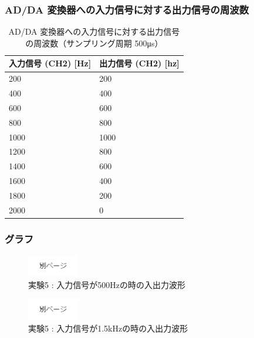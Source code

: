 \documentclass[10pt]{article}
\begin{document}
\subsubsection{AD/DA 変換器への入力信号に対する出力信号の周波数}

\begingroup
\setlength{\tabcolsep}{5pt} %
\renewcommand{\arraystretch}{1.5} %
\begin{table}[H]
    \centering
	\caption{AD/DA 変換器への入力信号に対する出力信号の周波数（サンプリング周期 500μs） }
	\begin{tabular}{|l|l|}
	    \hline
	      入力信号 (CH2) [Hz] & 出力信号 (CH2) [hz]\\[0.5ex]
		\hline\hline
            200  & 200  \\ \hline
            400  & 400  \\ \hline
            600  & 600  \\ \hline
            800  & 800  \\ \hline
            1000 & 1000 \\ \hline
            1200 & 800  \\ \hline
            1400 & 600  \\ \hline
            1600 & 400  \\ \hline
            1800 & 200  \\ \hline
            2000 & 0    \\ \hline
	\end{tabular}
\end{table} 
\endgroup

\subsubsection{グラフ}

\begin{figure}[H]
		\centering
		\includegraphics[width=0.2\textwidth]{page.png}
		\caption{実験5 : 入力信号が500Hzの時の入出力波形}
\end{figure}

\begin{figure}[H]
		\centering
		\includegraphics[width=0.2\textwidth]{page.png}
		\caption{実験5 : 入力信号が1.5kHzの時の入出力波形}
\end{figure}
\pagebreak
\end{document}
